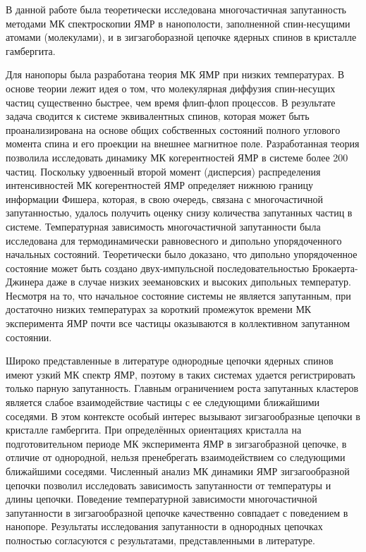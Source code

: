 В данной работе была теоретически исследована многочастичная запутанность методами МК спектроскопии ЯМР в нанополости,
заполненной спин-несущими атомами (молекулами),
и в зигзагоборазной цепочке ядерных спинов в кристалле гамбергита.

Для нанопоры была разработана теория МК ЯМР при низких температурах.
В основе теории лежит идея о том, что молекулярная диффузия спин-несущих частиц существенно быстрее,
чем время флип-флоп процессов.
В результате задача сводится к системе эквивалентных спинов,
которая может быть проанализирована на основе общих собственных состояний полного углового момента спина и его проекции на внешнее магнитное поле.
Разработанная теория позволила исследовать динамику МК когерентностей ЯМР в системе более 200 частиц.
Поскольку удвоенный второй момент (дисперсия) распределения интенсивностей МК когерентностей ЯМР определяет нижнюю границу информации Фишера,
которая, в свою очередь, связана с многочастичной запутанностью,
удалось получить оценку снизу количества запутанных частиц в системе.
Температурная зависимость многочастичной запутанности была исследована для термодинамически равновесного  и дипольно упорядоченного
начальных состояний.
Теоретически было доказано,
что дипольно упорядоченное состояние может быть создано двух-импульсной последовательностью Брокаерта-Джинера
даже в случае низких зеемановских и высоких дипольных температур.
Несмотря на то, что начальное состояние системы не является запутанным,
при достаточно низких температурах за короткий промежуток времени МК эксперимента ЯМР почти все частицы оказываются в коллективном запутанном состоянии.

Широко представленные в литературе однородные цепочки ядерных спинов имеют узкий МК спектр ЯМР,
поэтому в таких системах удается регистрировать только парную запутанность.
Главным ограничением роста запутанных кластеров является слабое взаимодействие частицы с ее следующими ближайшими соседями.
В этом контексте особый интерес вызывают зигзагообразные цепочки в кристалле гамбергита.
При определённых ориентациях кристалла на подготовительном периоде МК эксперимента ЯМР в зигзагобразной цепочке,
в отличие от однородной,
нельзя пренебрегать взаимодействием со следующими ближайшими соседями.
Численный анализ МК динамики ЯМР зигзагообразной цепочки позволил
исследовать зависимость запутанности от температуры и длины цепочки.
Поведение температурной зависимости многочастичной запутанности в зигзагообразной цепочке качественно совпадает с поведением в нанопоре.
Результаты исследования запутанности в однородных цепочках полностью согласуются с результатами, представленными в литературе.

